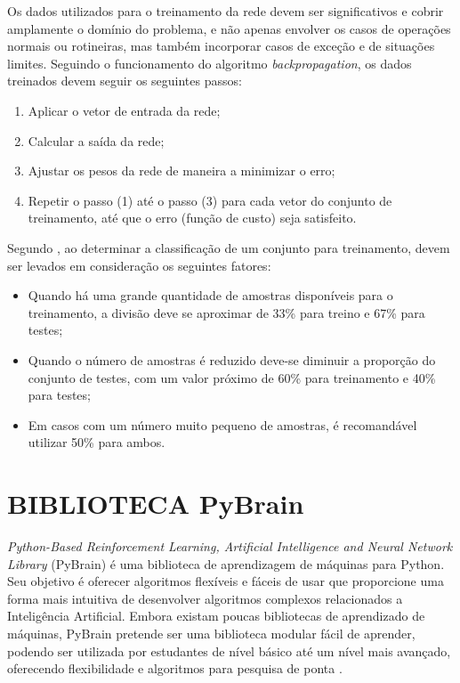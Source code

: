 Os dados utilizados para o treinamento da rede devem ser significativos e cobrir amplamente o domínio do problema, e não apenas envolver os casos de operações normais ou rotineiras, mas também incorporar casos de exceção e de situações limites. Seguindo o funcionamento do algoritmo \textit{backpropagation}, os dados treinados devem seguir os seguintes passos:

\begin{enumerate}
\item Aplicar o vetor de entrada da rede;
\item Calcular a saída da rede;
\item Ajustar os pesos da rede de maneira a minimizar o erro;
\item Repetir o passo (1) até o passo (3) para cada vetor do conjunto de treinamento, até que o erro (função de custo) seja satisfeito. 
\end{enumerate}

Segundo , ao determinar a classificação de um conjunto para treinamento, devem ser levados em consideração os seguintes fatores:

\begin{itemize}
\item Quando há uma grande quantidade de amostras disponíveis para o treinamento, a divisão deve se aproximar de 33\% para treino e 67\% para testes;
\item Quando o número de amostras é reduzido deve-se diminuir a proporção do conjunto de testes, com um valor próximo de 60\% para treinamento e 40\% para testes;
\item Em casos com um número muito pequeno de amostras, é recomandável utilizar 50\% para ambos.
\end{itemize}

\section{BIBLIOTECA PyBrain}
\textit{Python-Based Reinforcement Learning, Artificial Intelligence and Neural Network Library} (PyBrain) é uma biblioteca de aprendizagem de máquinas para Python. Seu objetivo é oferecer algoritmos flexíveis e fáceis de usar que proporcione uma forma mais intuitiva de desenvolver algoritmos complexos relacionados a Inteligência Artificial. Embora existam poucas bibliotecas de aprendizado de máquinas, PyBrain pretende ser uma biblioteca modular fácil de aprender, podendo ser utilizada por estudantes de nível básico até um nível mais avançado, oferecendo flexibilidade e algoritmos para pesquisa de ponta \cite{pybrain2010}.

